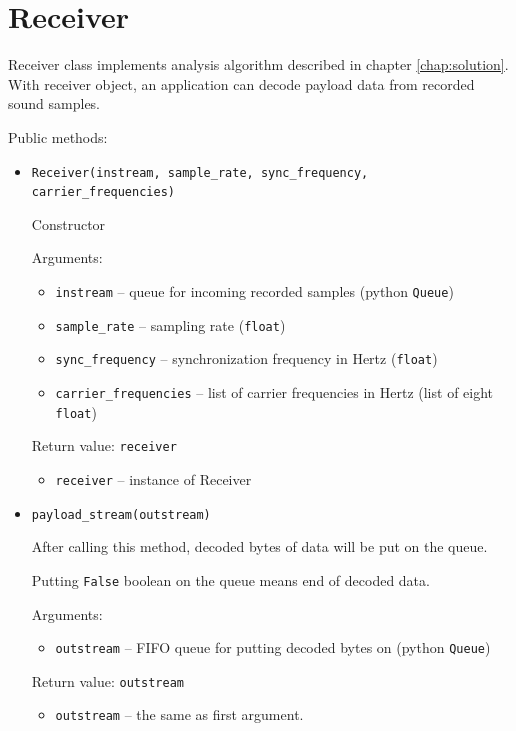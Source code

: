 \documentclass[english,bachelor,a4paper,oneside]{ppfcmthesis}
\begin{document}
\clearpage

\section{Receiver}

Receiver class implements analysis algorithm described in chapter \ref{chap:solution}. With receiver object, an application can decode payload data from recorded sound samples.

Public methods:

\begin{itemize}
\item \verb|Receiver(instream, sample_rate, sync_frequency, carrier_frequencies)|

  Constructor

  Arguments:
  \begin{itemize}
  \item \verb|instream| -- queue for incoming recorded samples (python \verb|Queue|)
  \item \verb|sample_rate| -- sampling rate (\verb|float|)
  \item \verb|sync_frequency| -- synchronization frequency in Hertz (\verb|float|)
  \item \verb|carrier_frequencies| -- list of carrier frequencies in Hertz (list of eight \verb|float|)
  \end{itemize}

  Return value: \verb|receiver|
  \begin{itemize}
  \item \verb|receiver| -- instance of Receiver
  \end{itemize}

\item \verb|payload_stream(outstream)|

  After calling this method, decoded bytes of data will be put on the queue.

  Putting \verb|False| boolean on the queue means end of decoded data.

  Arguments:
  \begin{itemize}
  \item \verb|outstream| -- FIFO queue for putting decoded bytes on (python \verb|Queue|)
  \end{itemize}

  Return value: \verb|outstream|
  \begin{itemize}
  \item \verb|outstream| -- the same as first argument.
  \end{itemize}

\end{itemize}
\end{document}
